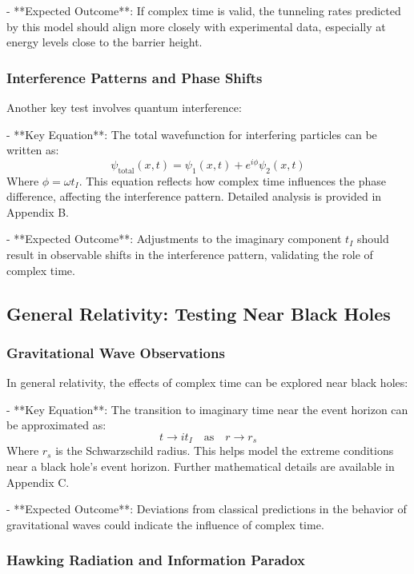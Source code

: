 \documentclass{article}
\begin{document}
- **Expected Outcome**: If complex time is valid, the tunneling rates predicted by this model should align more closely with experimental data, especially at energy levels close to the barrier height.

\subsubsection{Interference Patterns and Phase Shifts}

Another key test involves quantum interference:

- **Key Equation**: The total wavefunction for interfering particles can be written as:
\[
\psi_{\text{total}}(x, t) = \psi_1(x, t) + e^{i \phi} \psi_2(x, t)
\]
Where \( \phi = \omega t_I \). This equation reflects how complex time influences the phase difference, affecting the interference pattern. Detailed analysis is provided in Appendix B.

- **Expected Outcome**: Adjustments to the imaginary component \( t_I \) should result in observable shifts in the interference pattern, validating the role of complex time.

\subsection{General Relativity: Testing Near Black Holes}

\subsubsection{Gravitational Wave Observations}

In general relativity, the effects of complex time can be explored near black holes:

- **Key Equation**: The transition to imaginary time near the event horizon can be approximated as:
\[
t \rightarrow i t_I \quad \text{as} \quad r \rightarrow r_s
\]
Where \( r_s \) is the Schwarzschild radius. This helps model the extreme conditions near a black hole’s event horizon. Further mathematical details are available in Appendix C.

- **Expected Outcome**: Deviations from classical predictions in the behavior of gravitational waves could indicate the influence of complex time.

\subsubsection{Hawking Radiation and Information Paradox}
\end{document}
